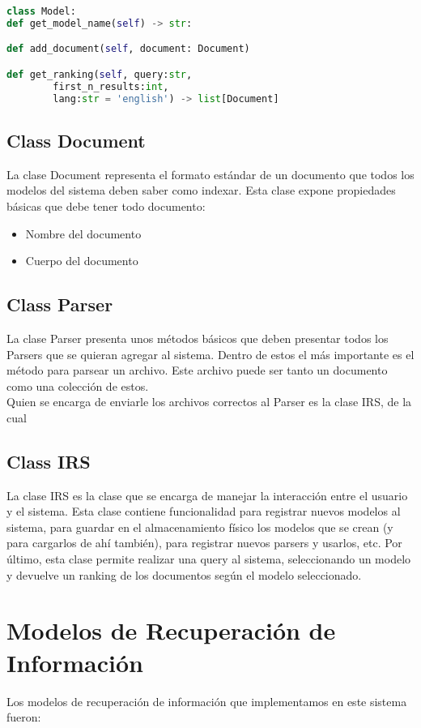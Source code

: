 \documentclass[12pt]{article}
\begin{document}
\begin{lstlisting}[frame=single, language=Python]
class Model:
def get_model_name(self) -> str:

def add_document(self, document: Document)

def get_ranking(self, query:str, 
		first_n_results:int, 
		lang:str = 'english') -> list[Document]
\end{lstlisting}

\subsection{Class Document}

La clase Document representa el formato estándar de un documento que todos los modelos del sistema
deben saber como indexar.
Esta clase expone propiedades básicas que debe tener todo documento:
\begin{itemize}
	\item Nombre del documento
	\item Cuerpo del documento
\end{itemize}

\subsection{Class Parser}
La clase Parser presenta unos métodos básicos que deben presentar todos los Parsers que se quieran
agregar al sistema. Dentro de estos el más importante es el método para parsear un archivo. Este archivo
puede ser tanto un documento como una colección de estos.\\
Quien se encarga de enviarle los archivos correctos al Parser es la clase IRS, de la cual

\subsection{Class IRS}
La clase IRS es la clase que se encarga de manejar la interacción entre el usuario y el sistema. Esta clase
contiene funcionalidad para registrar nuevos modelos al sistema, para guardar en el almacenamiento físico
los modelos que se crean (y para cargarlos de ahí también), para registrar nuevos parsers y usarlos, etc.
Por último, esta clase permite realizar una query al sistema, seleccionando un modelo y devuelve un ranking
de los documentos según el modelo seleccionado.

\section{Modelos de Recuperación de Información}
Los modelos de recuperación de información que implementamos en este sistema fueron:
\end{document}
